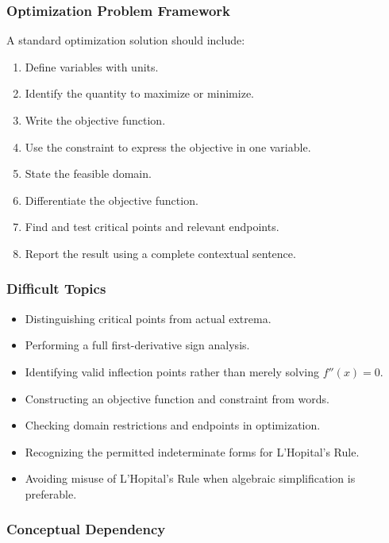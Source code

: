\documentclass[11pt]{article}
\begin{document}
\subsubsection{Optimization Problem Framework}

A standard optimization solution should include:

\begin{enumerate}
    \item Define variables with units.
    \item Identify the quantity to maximize or minimize.
    \item Write the objective function.
    \item Use the constraint to express the objective in one variable.
    \item State the feasible domain.
    \item Differentiate the objective function.
    \item Find and test critical points and relevant endpoints.
    \item Report the result using a complete contextual sentence.
\end{enumerate}

\subsubsection{Difficult Topics}

\begin{itemize}
    \item Distinguishing critical points from actual extrema.
    \item Performing a full first-derivative sign analysis.
    \item Identifying valid inflection points rather than merely solving $f''(x)=0$.
    \item Constructing an objective function and constraint from words.
    \item Checking domain restrictions and endpoints in optimization.
    \item Recognizing the permitted indeterminate forms for L'Hopital's Rule.
    \item Avoiding misuse of L'Hopital's Rule when algebraic simplification is preferable.
\end{itemize}

\subsubsection{Conceptual Dependency}
\end{document}
